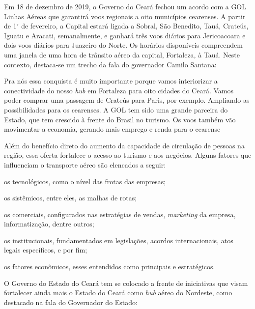 \documentclass[
	12pt,				%
	openright,			%
	twoside,			%
	a4paper,			%
	chapter=TITLE,		%
	english,			%
	french,				%
	spanish,			%
	brazil,				%
	]{abntex2}
\begin{document}
Em 18 de dezembro de 2019, o Governo do Ceará fechou  um acordo com a GOL Linhas Aéreas que garantirá voos regionais a oito municípios cearenses. A partir de 1$^\circ$ de fevereiro, a Capital estará ligada a Sobral, São Benedito, Tauá, Crateús, Iguatu e Aracati, semanalmente, e ganhará três voos diários para Jericoacoara e dois voos diários para Juazeiro do Norte. Os horários disponíveis compreendem uma janela de uma hora de tr\^ansito aéreo da capital, Fortaleza, à Tauá. Neste contexto, destaca-se um trecho da fala do governador Camilo Santana:

\begin{citacao}
Pra nós essa conquista é muito importante porque vamos interiorizar a conectividade do nosso \textit{hub} em Fortaleza para oito cidades do Ceará. Vamos poder comprar uma passagem de Crateús para Paris, por exemplo. Ampliando as possibilidades para os cearenses. A GOL tem sido uma grande parceira do Estado, que tem crescido à frente do Brasil no turismo. Os voos também vão movimentar a economia, gerando mais emprego e renda para o cearense \cite{voos2019camilo}
\end{citacao}



Além do benefício direto do aumento da capacidade de circulação de pessoas na região, essa oferta fortalece o acesso ao turismo e aos negócios. Alguns fatores que influenciam o transporte aéreo são elencados a seguir:
\begin{alineas}
    \item os tecnológicos, como o nível das frotas das empresas;
    \item os sistêmicos, entre eles, as malhas de rotas;
    \item os comerciais, configurados nas estratégias de vendas, \textit{marketing} da empresa, informatização, dentre outros;
    \item os institucionais, fundamentados em legislações, acordos
internacionais, atos legais específicos, e por fim;
    \item os fatores econômicos, esses entendidos como principais e estratégicos.
\end{alineas}


O Governo do Estado do Ceará tem se colocado a frente de iniciativas que visam  fortalecer ainda mais o Estado do Ceará como \textit{hub} aéreo do Nordeste, como destacado na fala do Governador do Estado:
\end{document}
